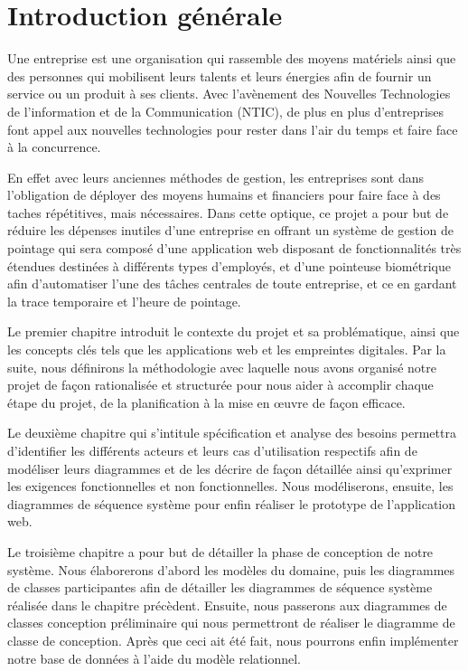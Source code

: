 \chapter*{Introduction générale}
\renewcommand{\headrulewidth}{1pt}
\onehalfspacing
\thispagestyle{empty}
    
Une entreprise est une organisation qui rassemble des moyens matériels ainsi que
des personnes qui mobilisent leurs talents et leurs énergies afin de fournir un
service ou un produit à ses clients. Avec l’avènement des Nouvelles Technologies
de l’information et de la Communication (NTIC), de plus en plus d’entreprises font
appel aux nouvelles technologies pour rester dans l’air du temps et faire face à
la concurrence.

En effet avec leurs anciennes méthodes de gestion, les entreprises sont dans
l’obligation de déployer des moyens humains et financiers pour faire face à des
taches répétitives, mais nécessaires. Dans cette optique, ce projet a pour but
de réduire les dépenses inutiles d’une entreprise en offrant un système de
gestion de pointage qui sera composé d’une application web disposant de
fonctionnalités très étendues destinées à différents types d’employés, et d’une
pointeuse biométrique afin d’automatiser l’une des tâches centrales de toute
entreprise, et ce en gardant la trace temporaire et l’heure de pointage.

Le premier chapitre introduit le contexte du projet et sa problématique, ainsi
que les concepts clés tels que les applications web et les empreintes digitales.
Par la suite, nous définirons la méthodologie avec laquelle nous avons organisé
notre projet de façon rationalisée et structurée pour nous aider à accomplir
chaque étape du projet, de la planification à la mise en œuvre de façon
efficace.

Le deuxième chapitre qui s’intitule spécification et analyse des besoins
permettra d’identifier les différents acteurs et leurs cas d’utilisation
respectifs afin de modéliser leurs diagrammes et de les décrire de façon
détaillée ainsi qu’exprimer les exigences fonctionnelles et non fonctionnelles.
Nous modéliserons, ensuite, les diagrammes de séquence système pour enfin
réaliser le prototype de l’application web.

Le troisième chapitre a pour but de détailler la phase de conception de notre
système. Nous élaborerons d’abord les modèles du domaine, puis les diagrammes de
classes participantes afin de détailler les diagrammes de séquence système
réalisée dans le chapitre précèdent. Ensuite, nous passerons aux diagrammes de
classes conception préliminaire qui nous permettront de réaliser le diagramme de
classe de conception. Après que ceci ait été fait, nous pourrons enfin
implémenter notre base de données à l’aide du modèle relationnel. 

